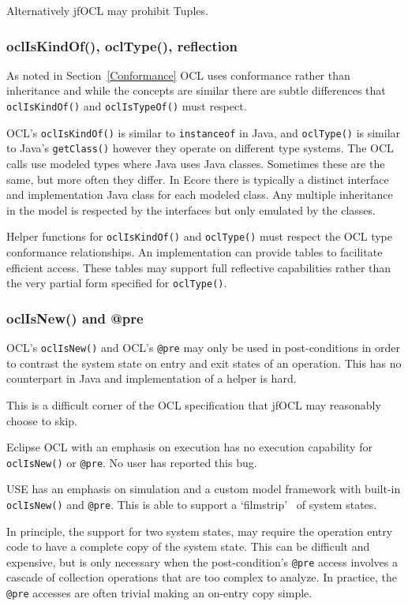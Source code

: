 \documentclass[sigconf]{acmart}
\begin{document}
Alternatively jfOCL may prohibit Tuples.

\subsubsection{oclIsKindOf(), oclType(), reflection}

As noted in Section~\ref{Conformance} OCL uses conformance rather than inheritance and while the concepts are similar there are subtle differences that \texttt{oclIsKindOf()} and \texttt{oclIsTypeOf()} must respect.

OCL's \texttt{oclIsKindOf()} is similar to \texttt{instanceof} in Java, and
\texttt{oclType()} is similar to Java's \texttt{getClass()} however they operate on different type systems. The OCL calls use modeled types where Java uses Java classes. Sometimes these are the same, but more often they differ. In Ecore there is typically a distinct interface and implementation Java class for each modeled class. Any multiple inheritance in the model is respected by the interfaces but only emulated by the classes.

Helper functions for \texttt{oclIsKindOf()} and \texttt{oclType()} must respect the OCL type conformance relationships. An implementation can provide tables to facilitate efficient access. These tables may support full reflective capabilities rather than the very partial form specified for \texttt{oclType()}.

\subsubsection{oclIsNew() and @pre}

OCL's \texttt{oclIsNew()} and OCL's \texttt{@pre} may only be used in post-conditions in order to contrast the system state on entry and exit states of an operation. This has no counterpart in Java and implementation of a helper is hard.

This is a difficult corner of the OCL specification that jfOCL may reasonably choose to skip.

Eclipse OCL\cite{Eclipse-OCL} with an emphasis on execution has no execution capability for \texttt{oclIsNew()} or \texttt{@pre}. No user has reported this bug.

USE\cite{USE} has an emphasis on simulation and a custom model framework with  built-in \texttt{oclIsNew()} and \texttt{@pre}. This is able to support a `filmstrip'~\cite{Desai} of system states.

In principle, the support for two system states, may require the operation entry code to have a complete copy of the system state. This can be difficult and expensive, but is only necessary when the post-condition's \texttt{@pre} access involves a cascade of collection operations that are too complex to analyze. In practice, the \texttt{@pre} accesses are often trivial making an on-entry copy simple.
\end{document}
